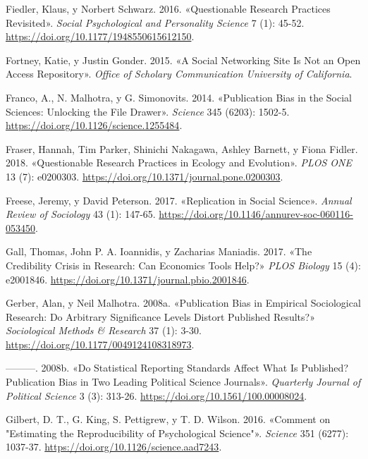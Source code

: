 \documentclass[
  spanish,
  letterpaper,
  DIV=11,
  numbers=noendperiod]{scrreprt}
\newlength{\cslhangindent}
\newenvironment{CSLReferences}[2] %
 {\begin{list}{}{%
  \setlength{\itemindent}{0pt}
  \setlength{\leftmargin}{0pt}
  \setlength{\parsep}{0pt}
  \ifodd #1
   \setlength{\leftmargin}{\cslhangindent}
   \setlength{\itemindent}{-1\cslhangindent}
  \fi
  \setlength{\itemsep}{#2\baselineskip}}}
 {\end{list}}
\begin{document}
\begin{CSLReferences}{1}{0}
Fiedler, Klaus, y Norbert Schwarz. 2016. {«Questionable {Research
Practices Revisited}»}. \emph{Social Psychological and Personality
Science} 7 (1): 45-52. \url{https://doi.org/10.1177/1948550615612150}.

Fortney, Katie, y Justin Gonder. 2015. {«A Social Networking Site Is Not
an Open Access Repository»}. \emph{Office of Scholary Communication
University of California}.

Franco, A., N. Malhotra, y G. Simonovits. 2014. {«Publication Bias in
the Social Sciences: {Unlocking} the File Drawer»}. \emph{Science} 345
(6203): 1502-5. \url{https://doi.org/10.1126/science.1255484}.

Fraser, Hannah, Tim Parker, Shinichi Nakagawa, Ashley Barnett, y Fiona
Fidler. 2018. {«Questionable Research Practices in Ecology and
Evolution»}. \emph{PLOS ONE} 13 (7): e0200303.
\url{https://doi.org/10.1371/journal.pone.0200303}.

Freese, Jeremy, y David Peterson. 2017. {«Replication in {Social
Science}»}. \emph{Annual Review of Sociology} 43 (1): 147-65.
\url{https://doi.org/10.1146/annurev-soc-060116-053450}.

Gall, Thomas, John P. A. Ioannidis, y Zacharias Maniadis. 2017. {«The
Credibility Crisis in Research: {Can} Economics Tools Help?»} \emph{PLOS
Biology} 15 (4): e2001846.
\url{https://doi.org/10.1371/journal.pbio.2001846}.

Gerber, Alan, y Neil Malhotra. 2008a. {«Publication {Bias} in {Empirical
Sociological Research}: {Do Arbitrary Significance Levels Distort
Published Results}?»} \emph{Sociological Methods \& Research} 37 (1):
3-30. \url{https://doi.org/10.1177/0049124108318973}.

---------. 2008b. {«Do {Statistical Reporting Standards Affect What Is
Published}? {Publication Bias} in {Two Leading Political Science
Journals}»}. \emph{Quarterly Journal of Political Science} 3 (3):
313-26. \url{https://doi.org/10.1561/100.00008024}.

Gilbert, D. T., G. King, S. Pettigrew, y T. D. Wilson. 2016. {«Comment
on "{Estimating} the Reproducibility of Psychological Science"»}.
\emph{Science} 351 (6277): 1037-37.
\url{https://doi.org/10.1126/science.aad7243}.


\end{CSLReferences}
\end{document}

